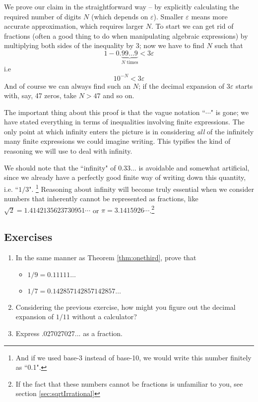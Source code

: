 We prove our claim in the straightforward way -- by explicitly calculating the required number of digits $N$ (which depends on $\varepsilon$). Smaller $\varepsilon$ means more accurate approximation, which requires larger $N$. To start we can get rid of fractions (often a good thing to do when manipulating algebraic expressions) by multiplying both sides of the inequality by 3; now we have to find $N$ such that
\[
1 - 0.\underbrace{99\ldots9}_\text{$N$ times}  < 3\varepsilon 
\]
i.e
\[
10^{-N} < 3\varepsilon 
\]
And of course we can always find such an $N$; if the decimal expansion of $3\varepsilon$ starts with, say, 47 zeros, take $N>47$ and so on. 

The important thing about this proof is that the vague notation ``$\cdots$" is gone; we have stated everything in terms of inequalities involving finite expressions. The only point at which infinity enters the picture is in considering \emph{all} of the infinitely many finite expressions we could imagine writing.  This typifies the kind of reasoning we will use to deal with infinity. 

We should note that the ``infinity" of $0.33\ldots$ is avoidable and somewhat artificial, since we already have a perfectly good finite way of writing down this quantity, i.e. ``$1/3$". \footnote{And if we used base-3 instead of base-10, we would write this number finitely as ``0.1".}
Reasoning about infinity will become truly essential when we consider numbers that inherently cannot be represented as fractions,  like $\sqrt{2}=1.4142135623730951\cdots$ or  $\pi = 3.1415926\cdots$.\footnote{If the fact that these numbers cannot be fractions is unfamiliar to you, see section \ref{sec:sqrtIrrational}}

\subsection{Exercises}
\begin{enumerate}
\item In the same manner as Theorem \ref{thm:onethird}, prove that
	\begin{itemize}
	\item $1/9 = 0.11111\ldots$
	\item $1/7=0.142857142857142857\ldots$
	\end{itemize}
\item Considering the previous exercise, how might you figure out the decimal expansion of $1/11$ without a calculator?
\item Express .027027027... as a fraction. 
\end{enumerate}


